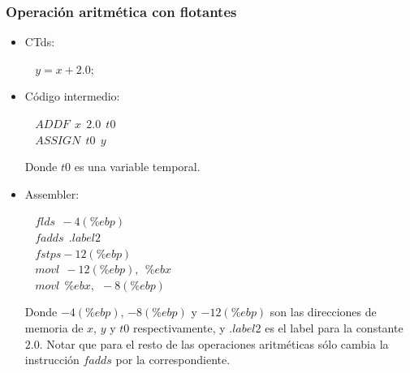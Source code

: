 \documentclass[11pt,a4paper]{article}
\begin{document}
\subsubsection{Operación aritmética con flotantes}
\begin{itemize}
	\item CTds:
		\begin{flushleft}
			$\ \ \ \ y = x + 2.0 ;$
		\end{flushleft}
	\item Código intermedio:
		\begin{flushleft}
			$\ \ \ \ ADDF \ \ x \ \ 2.0 \ \ t0$ \\
			$\ \ \ \ ASSIGN \ \ t0 \ \ y$
		\end{flushleft}
		Donde $t0$ es una variable temporal.
	\item Assembler:
		\begin{flushleft}
			$\ \ \ \ flds \ \ -4(\%ebp) $ \\
			$\ \ \ \ fadds \ \ .label2$ \\
			$\ \ \ \ fstps -12(\%ebp)$ \\
			$\ \ \ \ movl \ \ -12(\%ebp), \ \ \%ebx$ \\
			$\ \ \ \ movl \ \ \%ebx, \ \ -8(\%ebp)$	
		\end{flushleft}
		Donde $-4(\%ebp)$, $-8(\%ebp)$ y $-12(\%ebp)$ son las direcciones de memoria de $x$, $y$ y $t0$ respectivamente, y $.label2$ es el label para la constante $2.0$. Notar que para el resto de las operaciones aritméticas sólo cambia la instrucción $fadds$ por la correspondiente.
\end{itemize}
\end{document}

